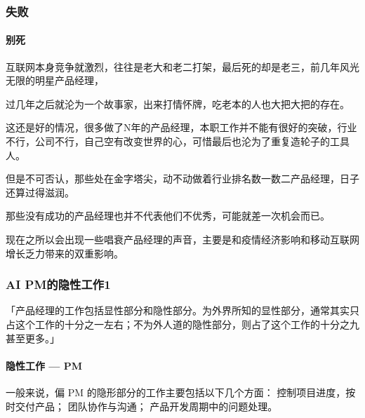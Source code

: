\documentclass[letterpaper,11pt,english]{sphinxmanual}
\begin{document}
\subsubsection{失败}
\label{\detokenize{chapter_experience/fail:id1}}\label{\detokenize{chapter_experience/fail::doc}}

\paragraph{别死}
\label{\detokenize{chapter_experience/fail:id2}}
互联网本身竞争就激烈，往往是老大和老二打架，最后死的却是老三，前几年风光无限的明星产品经理，

过几年之后就沦为一个故事家，出来打情怀牌，吃老本的人也大把大把的存在。

这还是好的情况，很多做了N年的产品经理，本职工作并不能有很好的突破，行业不行，公司不行，自己空有改变世界的心，可惜最后也沦为了重复造轮子的工具人。

但是不可否认，那些处在金字塔尖，动不动做着行业排名数一数二产品经理，日子还算过得滋润。

那些没有成功的产品经理也并不代表他们不优秀，可能就差一次机会而已。

现在之所以会出现一些唱衰产品经理的声音，主要是和疫情经济影响和移动互联网增长乏力带来的双重影响。


\subsubsection{AI PM的隐性工作1\sphinxfootnotemark[223]}
\label{\detokenize{chapter_experience/recessive_work:ai-pm1}}\label{\detokenize{chapter_experience/recessive_work::doc}}%
\begin{footnotetext}[223]\sphinxAtStartFootnote
{}
%
\end{footnotetext}\ignorespaces 
「产品经理的工作包括显性部分和隐性部分。为外界所知的显性部分，通常其实只占这个工作的十分之一左右；不为外人道的隐性部分，则占了这个工作的十分之九甚至更多。」


\paragraph{隐性工作 — PM}
\label{\detokenize{chapter_experience/recessive_work:pm}}
一般来说，偏 PM 的隐形部分的工作主要包括以下几个方面：
控制项目进度，按时交付产品； 团队协作与沟通； 产品开发周期中的问题处理。
\end{document}
